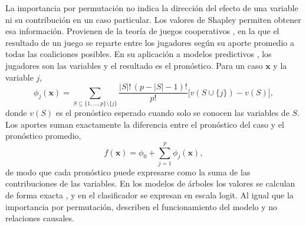 La importancia por permutación no indica la dirección del efecto de una variable ni su contribución en un caso particular. Los valores de Shapley permiten obtener esa información. Provienen de la teoría de juegos cooperativos \citep{shapley1953}, en la que el resultado de un juego se reparte entre los jugadores según su aporte promedio a todas las coaliciones posibles. En su aplicación a modelos predictivos \citep{lundberg2017}, los jugadores son las variables y el resultado es el pronóstico. Para un caso $\mathbf{x}$ y la variable $j$,
\begin{equation}
\phi_j(\mathbf{x})=\sum_{S\subseteq\{1,\dots,p\}\setminus\{j\}}\frac{|S|!\,(p-|S|-1)!}{p!}\Big[v(S\cup\{j\})-v(S)\Big],
\end{equation}
donde $v(S)$ es el pronóstico esperado cuando solo se conocen las variables de $S$. Los aportes suman exactamente la diferencia entre el pronóstico del caso y el pronóstico promedio,
\begin{equation}
f(\mathbf{x})=\phi_0+\sum_{j=1}^{p}\phi_j(\mathbf{x}),
\end{equation}
de modo que cada pronóstico puede expresarse como la suma de las contribuciones de las variables. En los modelos de árboles los valores se calculan de forma exacta \citep{lundberg2020}, y en el clasificador se expresan en escala logit. Al igual que la importancia por permutación, describen el funcionamiento del modelo y no relaciones causales.

\FloatBarrier
